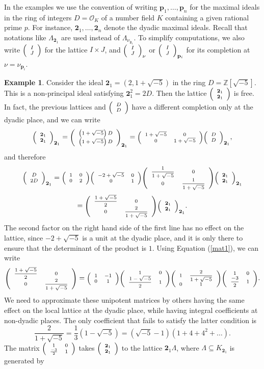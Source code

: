 \documentclass{article}
\theoremstyle{definition}
\newtheorem{ex}[Prop]{Example}
\theoremstyle{remark}
\newcommand\sbmattrix[4]{\textnormal{\scriptsize$\left(\begin{array}{cc}#1&#2\\#3&#4\end{array}\right)$\normalsize}}
\newcommand\sbvecttor[2]{\textnormal{\scriptsize$\left(\begin{array}{cc}#1\\#2\end{array}\right)$\normalsize}}
\begin{document}
In the examples we use the convention of writing 
$\mathbf{p}_1,\dots,\mathbf{p}_n$ for the maximal ideals in 
the ring of integers $D=\mathcal{O}_K$ of a number field $K$
containing a given rational prime $p$.
For instance, $\mathbf{2}_1,\dots,\mathbf{2}_n$ denote the dyadic
maximal ideals. Recall that notations like
$\Lambda_{\mathbf{2}_1}$ are used instead of
$\Lambda_{\nu_{\mathbf{2}_1}}$.
To simplify computations, we also write $\sbvecttor IJ$
for the lattice $I\times J$, and ${\sbvecttor IJ}_\nu$ or
${\sbvecttor IJ}_{\mathbf{p}_i}$ for its completion
at $\nu=\nu_{\mathbf{p}_i}$.
\begin{ex}\label{ex1}
    Consider the ideal $\mathbf{2}_1=(2,1+\sqrt{-5})$ in the ring
    $D=\mathbb{Z}[\sqrt{-5}]$. This is a non-principal ideal satisfying
    $\mathbf{2}_1^2=2D$. Then the lattice 
    $\sbvecttor{\mathbf{2}_1}{\mathbf{2}_1}$ is free.
    In fact, the previous lattices and $\sbvecttor{D}{D}$ have a different
    completion only at the dyadic place, and we can write
    $${\sbvecttor{\mathbf{2}_1}{\mathbf{2}_1}}_{\mathbf{2}_1}=
     {\sbvecttor{\left(1+\sqrt{-5}\right)D}{\left(1+\sqrt{-5}\right)D}}_{\mathbf{2}_1}=
     \sbmattrix{1+\sqrt{-5}}00{1+\sqrt{-5}}
     {\sbvecttor DD}_{\mathbf{2}_1},$$
    and therefore
    $$
    {\sbvecttor D{2D}}_{\mathbf{2}_1}=
     \sbmattrix1002\sbmattrix{-2+\sqrt{-5}}001
     \sbmattrix{\frac1{1+\sqrt{-5}}}00{\frac1{1+\sqrt{-5}}}
     {\sbvecttor{\mathbf{2}_1}{\mathbf{2}_1}}_{\mathbf{2}_1}$$
     $$=\sbmattrix{\frac{1+\sqrt{-5}}2}00{\frac2{1+\sqrt{-5}}}
     {\sbvecttor{\mathbf{2}_1}{\mathbf{2}_1}}_{\mathbf{2}_1}
     .
    $$
    The second factor on the right hand side of the first line
    has no effect on the lattice, since $-2+\sqrt{-5}$ is a unit at
    the dyadic place, and it is only there to ensure that 
    the determinant of the product is $1$. 
    Using Equation (\ref{mat1}), we can write
    $$\sbmattrix{\frac{1+\sqrt{-5}}2}00{\frac2{1+\sqrt{-5}}}=
    \sbmattrix1{-1}01\sbmattrix10{\frac{1-\sqrt{-5}}2}1
    \sbmattrix1{\frac2{1+\sqrt{-5}}}01
    \sbmattrix10{\frac{-3}2}1.
    $$
    We need to approximate these unipotent matrices by others 
    having the same effect on the local lattice at the dyadic place, 
    while having integral coefficients at non-dyadic places. The only 
    coefficient that fails to satisfy the latter
    condition is $$\frac2{1+\sqrt{-5}}=\frac13(1-\sqrt{-5})=
    (\sqrt{-5}-1)(1+4+4^2+\dots).$$
    The matrix $\sbmattrix10{\frac{-3}2}1$ takes 
    $\sbvecttor{\mathbf{2}_1}{\mathbf{2}_1}$ to the 
    lattice $\mathbf{2}_1\Lambda$,
    where $\Lambda\subseteq K_{\mathbf{2}_1}$ is generated by 

\end{ex}
\end{document}

